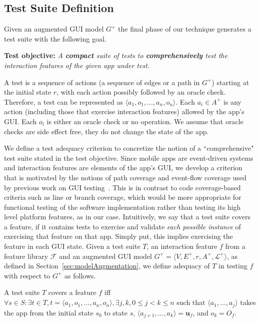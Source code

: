 \subsection{Test Suite Definition}
\label{sec:testSuiteDefinition}

Given an augmented GUI model $G^+$ the final phase of our technique generates a test suite with the following goal.

\noindent\textbf{Test objective:} \textit{A \textbf{compact} suite of tests to \textbf{comprehensively} test the interaction features of the given app under test.}

 A test is a sequence of actions (\ie a sequence of edges or a path in $G^+$) starting at the initial state $r$, with each action possibly followed by an oracle check. Therefore, a test can be represented as $\langle a_1, o_1, \dots, a_n, o_n \rangle$. Each $a_i \in A^+$ is any action (including those that exercise interaction features) allowed by the app's GUI. Each $o_i$ is either an oracle check or no operation. We assume that oracle checks are side effect free, \ie they do not change the state of the app.

We define a test adequacy criterion to concretize the notion of a ``comprehensive" test suite stated in the test objective. Since mobile apps are event-driven systems and interaction features are elements of the app's GUI, we develop a criterion that is motivated by the notions of path coverage and event-flow coverage used by previous work on GUI testing~\cite{memon2001coverage}. This is in contrast to code coverage-based criteria such as line or branch coverage, which would be more appropriate for functional testing of the software implementation rather than testing its high level platform features, as in our case. Intuitively, we say that a test suite covers a feature, if it contains tests to exercise and validate \textit{each possible instance} of exercising that feature on that app. Simply put, this implies exercising the feature in each GUI state. Given a test suite $T$, an interaction feature $f$ from a feature library $\mathcal{F}$ and an augmented GUI model $G^+ = \langle V, E^+, r, A^+, \mathcal{L}^+ \rangle$, as defined in Section~\ref{sec:modelAugmentation}, we define adequacy of $T$ in testing $f$ with respect to $G^+$ as follows.

\begin{mydef}
\label{def:coverage}
A test suite $T$ covers a feature $f$ iff $\forall s \in S: \exists t \in T, t = \langle a_1, o_1, \dots, a_n, o_n  \rangle, \exists j, k, 0 \leq j < k \leq n$ such that $\langle a_1, \dots, a_j \rangle$ takes the app from the initial state $s_0$ to state $s$, $\langle a_{j+1}, \dots, a_k \rangle = \mathbf{u}_f$, and $o_k = O_f$.
\end{mydef}

